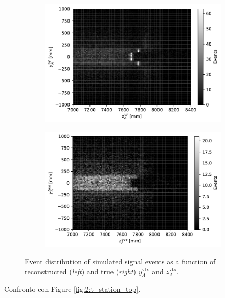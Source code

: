 \begin{figure}[t]
	\centering
	\begin{subfigure}{.45\textwidth}
		\includegraphics[width=\textwidth]{graphics/04-event_selection/Lambda_endvertex_z_vs_y.pdf}
		\caption{}
	\end{subfigure}
	\begin{subfigure}{.45\textwidth}
		\includegraphics[width=\textwidth]{graphics/04-event_selection/Lambda_endvertex_z_vs_y_true.pdf}
		\caption{}
	\end{subfigure}
	\caption{Event distribution of simulated \lbz signal events as a function of reconstructed (\textit{left}) and true (\textit{right}) $y_\Lambda^\text{vtx}$ and $z_\Lambda^\text{vtx}$.}
\end{figure}

Confronto con Figure \ref{fig:2:t_station_top}.

